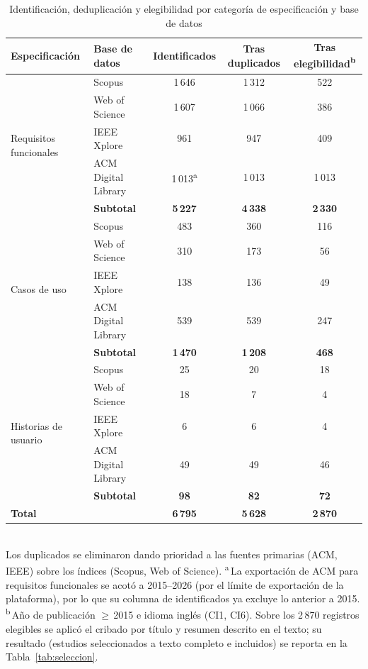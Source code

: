 \documentclass[10pt,journal,twoside,letterpaper]{IEEEtran}
\begin{document}
	\begin{table}[!t]
		\caption{Identificación, deduplicación y elegibilidad por categoría de especificación y base de datos}
		\label{tab:distrib}
		\centering
		\small
		\setlength{\tabcolsep}{6pt}
		\begin{tabular}{@{}llccc@{}}
			\toprule
			\textbf{Especificación} & \textbf{Base de datos} & \textbf{Identificados} & \textbf{Tras duplicados} & \textbf{Tras elegibilidad\textsuperscript{b}} \\
			\midrule
			\multirow{5}{*}{Requisitos funcionales} & Scopus & 1\,646 & 1\,312 & 522 \\
			& Web of Science      & 1\,607 & 1\,066 & 386 \\
			& IEEE Xplore         & 961    & 947    & 409 \\
			& ACM Digital Library & 1\,013\textsuperscript{a} & 1\,013 & 1\,013 \\
			\cmidrule(l){2-5}
			& \textbf{Subtotal}   & \textbf{5\,227} & \textbf{4\,338} & \textbf{2\,330} \\
			\midrule
			\multirow{5}{*}{Casos de uso} & Scopus & 483 & 360 & 116 \\
			& Web of Science      & 310 & 173 & 56 \\
			& IEEE Xplore         & 138 & 136 & 49 \\
			& ACM Digital Library & 539 & 539 & 247 \\
			\cmidrule(l){2-5}
			& \textbf{Subtotal}   & \textbf{1\,470} & \textbf{1\,208} & \textbf{468} \\
			\midrule
			\multirow{5}{*}{Historias de usuario} & Scopus & 25 & 20 & 18 \\
			& Web of Science      & 18 & 7 & 4 \\
			& IEEE Xplore         & 6 & 6 & 4 \\
			& ACM Digital Library & 49 & 49 & 46 \\
			\cmidrule(l){2-5}
			& \textbf{Subtotal}   & \textbf{98} & \textbf{82} & \textbf{72} \\
			\midrule
			\textbf{Total} & & \textbf{6\,795} & \textbf{5\,628} & \textbf{2\,870} \\
			\bottomrule
		\end{tabular}
		\\[3pt]
		{\footnotesize Los duplicados se eliminaron dando prioridad a las fuentes primarias (ACM, IEEE) sobre los índices (Scopus, Web of Science). \textsuperscript{a}\,La exportación de ACM para requisitos funcionales se acotó a 2015--2026 (por el límite de exportación de la plataforma), por lo que su columna de identificados ya excluye lo anterior a 2015. \textsuperscript{b}\,Año de publicación $\geq$\,2015 e idioma inglés (CI1, CI6). Sobre los 2\,870 registros elegibles se aplicó el cribado por título y resumen descrito en el texto; su resultado (estudios seleccionados a texto completo e incluidos) se reporta en la Tabla~\ref{tab:seleccion}.}
	\end{table}
	
\end{document}
